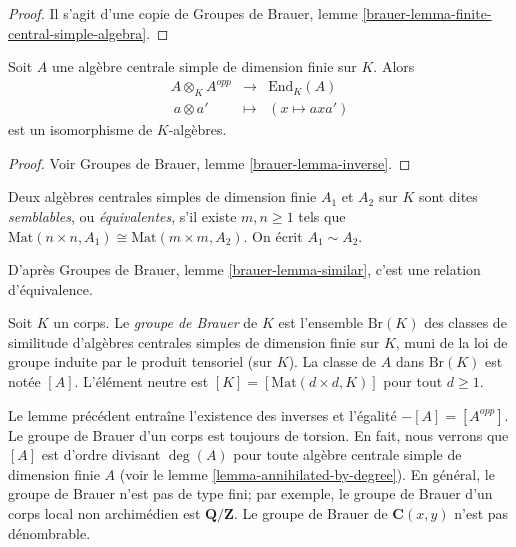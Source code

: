 \begin{proof}
Il s'agit d'une copie de
Groupes de Brauer, lemme \ref{brauer-lemma-finite-central-simple-algebra}.
\end{proof}

\begin{lemma}
\label{lemma-brauer-inverse}
Soit $A$ une alg\`ebre centrale simple de dimension finie sur $K$. Alors
$$
\begin{matrix}
A \otimes_K A^{opp} & \longrightarrow & \text{End}_K(A) \\
\ a \otimes a' & \longmapsto & (x \mapsto a x a')
\end{matrix}
$$
est un isomorphisme de $K$-alg\`ebres.
\end{lemma}

\begin{proof}
Voir
Groupes de Brauer, lemme \ref{brauer-lemma-inverse}.
\end{proof}

\begin{definition}
\label{definition-brauer-equivalent}
Deux alg\`ebres centrales simples de dimension finie $A_1$ et $A_2$ sur $K$ sont dites
{\it semblables}, ou {\it \'equivalentes}, s'il existe $m, n \geq 1$
tels que $\text{Mat}(n \times n, A_1)
\cong \text{Mat}(m \times m, A_2)$. On \'ecrit $A_1 \sim A_2$.
\end{definition}

\noindent
D'apr\`es Groupes de Brauer, lemme \ref{brauer-lemma-similar}, c'est une
relation d'\'equivalence.

\begin{definition}
\label{definition-brauer-group}
Soit $K$ un corps. Le {\it groupe de Brauer} de $K$ est l'ensemble $\text{Br} (K)$
des classes de similitude d'alg\`ebres centrales simples de dimension finie sur $K$, muni de
la loi de groupe induite par le produit tensoriel (sur $K$). La classe de $A$ dans
$\text{Br}(K)$ est not\'ee $[A]$. L'\'el\'ement neutre est
$[K] = [\text{Mat}(d \times d, K)]$ pour tout $d \geq 1$.
\end{definition}

\noindent
Le lemme pr\'ec\'edent entra\^ine l'existence des inverses et l'\'egalit\'e $-[A] = [A^{opp}]$.
Le groupe de Brauer d'un corps est toujours de torsion.
En fait, nous verrons que $[A]$ est d'ordre divisant $\deg(A)$
pour toute alg\`ebre centrale simple de dimension finie $A$ (voir le
lemme \ref{lemma-annihilated-by-degree}).
En g\'en\'eral, le groupe de Brauer n'est pas de type fini; par exemple,
le groupe de Brauer d'un corps local non archim\'edien est $\mathbf{Q}/\mathbf{Z}$.
Le groupe de Brauer de $\mathbf{C}(x, y)$ n'est pas d\'enombrable.

